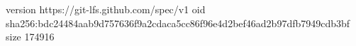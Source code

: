 version https://git-lfs.github.com/spec/v1
oid sha256:bdc24484aab9d757636f9a2cdaca5cc86f96e4d2bef46ad2b97dfb7949cdb3bf
size 174916
